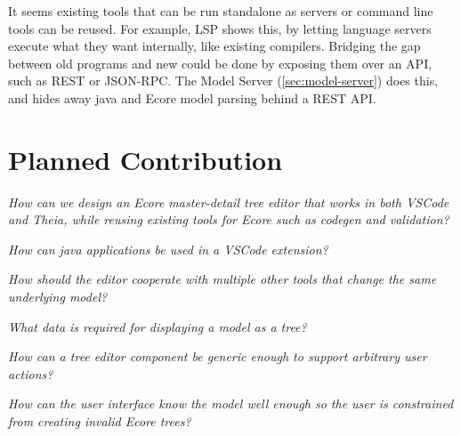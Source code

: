 It seems existing tools that can be run standalone as servers or command line tools can be reused.
For example, \gls{LSP} shows this, by letting language servers execute what they want internally, like existing compilers.
Bridging the gap between old programs and new could be done by exposing them over an \gls{API}, such as \gls{REST} or \gls{JSON-RPC}. The Model Server (\cref{sec:model-server}) does this, and hides away java and \gls{Ecore} model parsing behind a \gls{REST} \acrshort{API}.


\section{Planned Contribution}%

\begin{questions}[leftmargin=1cm,resume]
  \item \emph{How can we design an Ecore master-detail tree editor that works in both VSCode and Theia, while reusing existing tools for Ecore such as codegen and validation?}\label{rq:21}
  \begin{questions}
    \item \emph{How can java applications be used in a VSCode extension?}\label{rq:22}
    \item \emph{How should the editor cooperate with multiple other tools that change the same underlying model?}\label{rq:23}
    \item \emph{What data is required for displaying a model as a tree?}\label{rq:24}
    \item \emph{How can a tree editor component be generic enough to support arbitrary user actions?}\label{rq:25}
    \item \emph{How can the user interface know the model well enough so the user is constrained from creating invalid Ecore trees?}\label{rq:26}
  \end{questions}
\end{questions}

